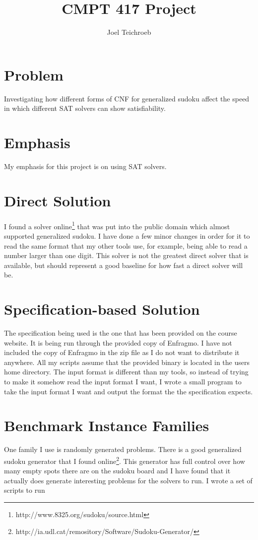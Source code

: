 \documentclass[11pt]{article} %
\title{CMPT 417 Project}
\author{Joel Teichroeb}
\begin{document}
\maketitle

\section{Problem}
Investigating how different forms of CNF for generalized sudoku affect the speed in which different SAT solvers can show satisfiability.

\section{Emphasis}
My emphasis for this project is on using SAT solvers.

\section{Direct Solution}
I found a solver online\footnote{http://www.8325.org/sudoku/source.html} that was put into the public domain which almost supported generalized sudoku. I have done a few minor changes in order for it to read the same format that my other tools use, for example, being able to read a number larger than one digit. This solver is not the greatest direct solver that is available, but should represent a good baseline for how fast a direct solver will be.

\section{Specification-based Solution}
The specification being used is the one that has been provided on the course website. It is being run through the provided copy of Enfragmo. I have not included the copy of Enfragmo in the zip file as I do not want to distribute it anywhere. All my scripts assume that the provided binary is located in the users home directory. The input format is different than my tools, so instead of trying to make it somehow read the input format I want, I wrote a small program to take the input format I want and output the format the the specification expects.

\section{Benchmark Instance Families}
One family I use is randomly generated problems. There is a good generalized sudoku generator that I found online\footnote{http://ia.udl.cat/remository/Software/Sudoku-Generator/}. This generator has full control over how many empty spots there are on the sudoku board and I have found that it actually does generate interesting problems for the solvers to run. I wrote a set of scripts to run
\end{document}
